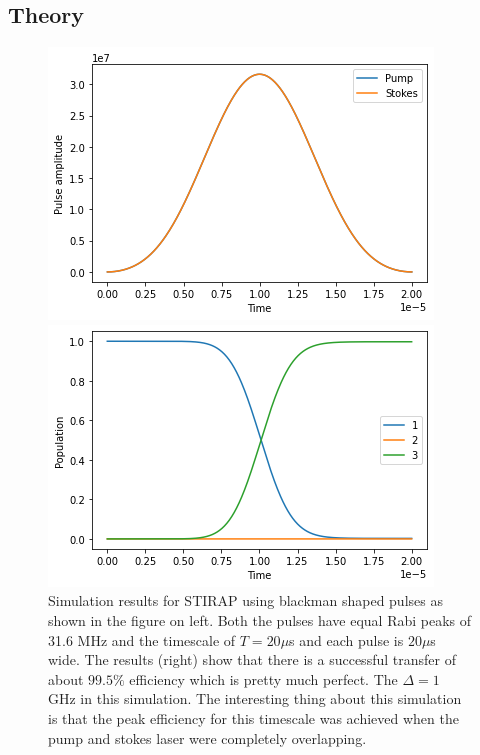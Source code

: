 \documentclass[%
 reprint,
 amsmath,amssymb,
 aps,
]{revtex4-2}
\begin{document}
\subsection{Theory}
\begin{figure}[ht]
\label{fig:sim1}
    \centering
    \begin{minipage}{0.47\textwidth}
        \centering
        \includegraphics[width=\textwidth]{images/sim-1-pulse.png} %
    \end{minipage}\hfill
    \begin{minipage}{0.47\textwidth}
        \centering
        \includegraphics[width=\textwidth]{images/sim-1-pop.png} %
    \end{minipage}
    \caption{Simulation results for STIRAP using blackman shaped pulses as shown in the figure on left. Both the pulses have equal Rabi peaks of 31.6 MHz and the timescale of $T=20\mu$s and each pulse is $20\mu$s wide. The results (right) show that there is a successful transfer of about $99.5\%$ efficiency which is pretty much perfect. The $\Delta = 1$ GHz in this simulation. The interesting thing about this simulation is that the peak efficiency for this timescale was achieved when the pump and stokes laser were completely overlapping.}
\end{figure}
\end{document}
